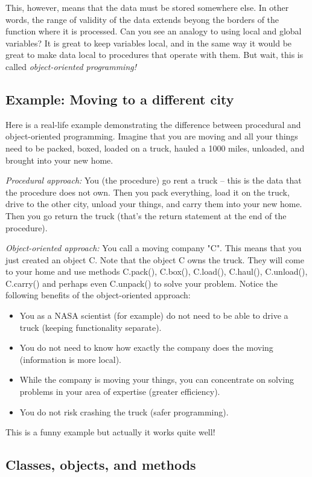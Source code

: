 This, however, means that the data must be stored somewhere else. In other
words, the range of validity of the data extends beyong the borders of the 
function where it is processed. 
Can you see an analogy to using local and global variables? It is great
to keep variables local, and in the same way it would be great to make
data local to procedures that operate with them. But wait, this is called {\em 
object-oriented programming!}

\subsection{Example: Moving to a different city}

Here is a real-life example demonstrating the difference between 
procedural and object-oriented programming. Imagine that you are moving 
and all your things need to be packed, boxed, loaded on a truck, hauled 
a 1000 miles, unloaded, and brought into your new home. 

{\em Procedural approach:} You (the procedure) 
go rent a truck -- this is the data that the procedure does not own. Then
you pack everything, load it on the truck, drive to the other city, 
unload your things, and carry them into your new home. Then you go 
return the truck (that's the return statement at the end of the procedure).

{\em Object-oriented approach:} You call a moving company "C". This means 
that you just created an object C. Note that the 
object C owns the truck. They will come to your home and use methods 
C.pack(), C.box(), C.load(), C.haul(), C.unload(), C.carry() and perhaps 
even C.unpack() to solve your problem. Notice the following benefits of the object-oriented approach: 
\begin{itemize}
\item You as a NASA scientist (for example) do not need to be able to drive 
      a truck (keeping functionality separate). 
\item You do not need to know how exactly the company does the moving
      (information is more local).
\item While the company is moving your things, you can concentrate on solving problems 
      in your area of expertise (greater efficiency).
\item You do not risk crashing the truck (safer programming).
\end{itemize}
This is a funny example but actually it works quite well!

\subsection{Classes, objects, and methods}

